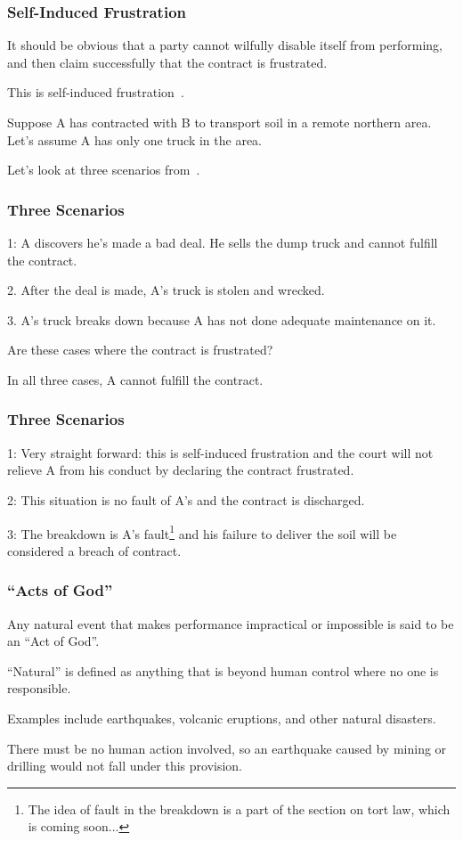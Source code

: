 \begin{frame}
\frametitle{Self-Induced Frustration}

It should be obvious that a party cannot wilfully disable itself from performing, and then claim successfully that the contract is frustrated.

This is \alert{self-induced frustration}~\cite{lba}.

Suppose A has contracted with B to transport soil in a remote northern area.\\
\quad Let's assume A has only one truck in the area. 

Let's look at three scenarios from~\cite{lba}.

\end{frame}



\begin{frame}
\frametitle{Three Scenarios}

1: A discovers he's made a bad deal. He sells the dump truck and cannot fulfill the contract.

2. After the deal is made, A's truck is stolen and wrecked.

3. A's truck breaks down because A has not done adequate maintenance on it.

Are these cases where the contract is frustrated?

In all three cases, A cannot fulfill the contract.

\end{frame}



\begin{frame}
\frametitle{Three Scenarios}

1: Very straight forward: this is self-induced frustration and the court will not relieve A from his conduct by declaring the contract frustrated.

2: This situation is no fault of A's and the contract is discharged.

3: The breakdown is A's fault\footnote{The idea of fault in the breakdown is a part of the section on tort law, which is coming soon...} and his failure to deliver the soil will be considered a breach of contract.

\end{frame}



\begin{frame}
\frametitle{``Acts of God''}

Any natural event that makes performance impractical or impossible is said to be an ``Act of God''.

``Natural'' is defined as anything that is beyond human control where no one is responsible.

Examples include earthquakes, volcanic eruptions, and other natural disasters.


There must be no human action involved, so an earthquake caused by mining or drilling would not fall under this provision.

\end{frame}



